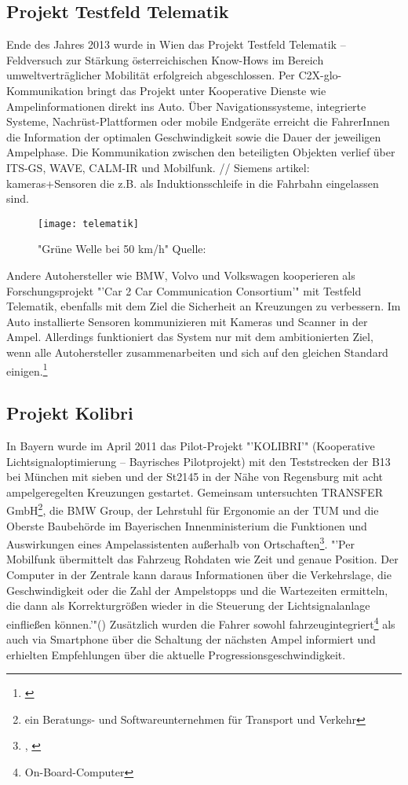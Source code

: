 \subsection{Projekt Testfeld Telematik}
Ende des Jahres 2013 wurde in Wien das Projekt Testfeld Telematik -- Feldversuch zur Stärkung österreichischen Know-Hows im Bereich umweltverträglicher Mobilität erfolgreich abgeschlossen. Per \gls{C2X-glo}-Kommunikation bringt das Projekt unter Kooperative Dienste wie Ampelinformationen direkt ins Auto. Über Navigationssysteme, integrierte Systeme, Nachrüst-Plattformen oder mobile Endgeräte erreicht die FahrerInnen die Information der optimalen Geschwindigkeit sowie die Dauer der jeweiligen Ampelphase. Die Kommunikation zwischen den beteiligten Objekten verlief über ITS-GS, WAVE, CALM-IR und Mobilfunk. // Siemens artikel: kameras+Sensoren die z.B. als Induktionsschleife in die Fahrbahn eingelassen sind.
\begin{figure}[H]
    \centering
    \texttt{[image: telematik]}
    \label{fig:telematik}
    \caption[Projekt Testfeld-Telematik Ampelinformation]{"Grüne Welle bei 50 km/h"  Quelle: \cite{telematik}}
\end{figure}
Andere Autohersteller wie \gls{BMW}, Volvo und Volkswagen kooperieren als Forschungsprojekt "'Car 2 Car Communication Consortium'" mit Testfeld Telematik, ebenfalls mit dem Ziel die Sicherheit an Kreuzungen zu verbessern. Im Auto installierte Sensoren kommunizieren mit Kameras und Scanner in der Ampel. Allerdings funktioniert das System nur mit dem ambitionierten Ziel, wenn alle Autohersteller zusammenarbeiten und sich auf den gleichen Standard einigen.\footnote{\cite{Siemens}}
\subsection{Projekt Kolibri}
In Bayern wurde im April 2011 das Pilot-Projekt "'KOLIBRI'" (Kooperative Lichtsignaloptimierung -- Bayrisches Pilotprojekt) mit den Teststrecken der B13 bei München mit sieben und der St2145 in der Nähe von Regensburg mit acht ampelgeregelten Kreuzungen gestartet. Gemeinsam untersuchten TRANSFER GmbH\footnote{ein Beratungs- und Softwareunternehmen für Transport und Verkehr}, die \gls{BMW} Group, der Lehrstuhl für Ergonomie an der \gls{TUM} und die Oberste Baubehörde im Bayerischen Innenministerium die Funktionen und Auswirkungen eines Ampelassistenten außerhalb von Ortschaften\footnote{\cite{kolibri}, \cite{kolibriTUM}}. "'Per Mobilfunk übermittelt das Fahrzeug Rohdaten wie Zeit und genaue Position. Der Computer in der Zentrale kann daraus Informationen über die Verkehrslage, die Geschwindigkeit oder die Zahl der Ampelstopps und die Wartezeiten ermitteln, die dann als Korrekturgrößen wieder in die Steuerung der Lichtsignalanlage einfließen können.'"(\cite{kolibriTUM}) Zusätzlich wurden die Fahrer sowohl fahrzeugintegriert\footnote{On-Board-Computer} als auch via Smartphone über die Schaltung der nächsten Ampel informiert und erhielten Empfehlungen über die aktuelle Progressionsgeschwindigkeit. 
